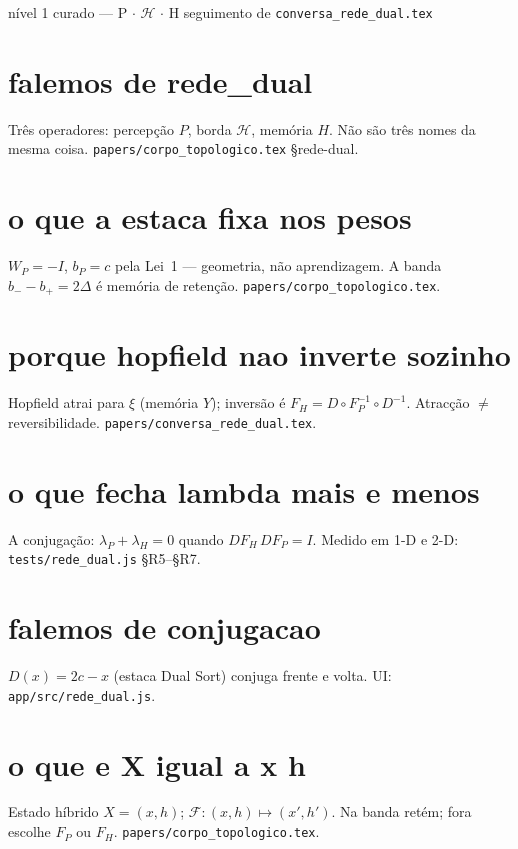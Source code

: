 \documentclass[11pt,a4paper]{article}
\newcommand{\code}[1]{\texttt{\small #1}}
\begin{document}
       {nível 1 curado --- P $\cdot$ $\mathcal{H}$ $\cdot$ H}
       {seguimento de \code{conversa\_rede\_dual.tex}}
\maketitle
\begin{abstract}
Follow-ups curtos sobre a rede neural dual.
Fonte: \code{papers/corpo\_topologico.tex} \S rede-dual;
medidor \code{tests/rede\_dual.js}.
\end{abstract}

\section{falemos de rede\_dual}
Três operadores: percepção $P$, borda $\mathcal{H}$, memória $H$.
Não são três nomes da mesma coisa.
\code{papers/corpo\_topologico.tex} \S rede-dual.

\section{o que a estaca fixa nos pesos}
$W_P=-I$, $b_P=c$ pela Lei~1 --- geometria, não aprendizagem.
A banda $b_{-}-b_{+}=2\Delta$ é memória de retenção.
\code{papers/corpo\_topologico.tex}.

\section{porque hopfield nao inverte sozinho}
Hopfield atrai para $\xi$ (memória $Y$); inversão é $F_H=D\circ F_P^{-1}\circ D^{-1}$.
Atracção $\neq$ reversibilidade.
\code{papers/conversa\_rede\_dual.tex}.

\section{o que fecha lambda mais e menos}
A conjugação: $\lambda_P+\lambda_H=0$ quando $DF_H\,DF_P=I$.
Medido em 1-D e 2-D: \code{tests/rede\_dual.js} §R5--§R7.

\section{falemos de conjugacao}
$D(x)=2c-x$ (estaca Dual Sort) conjuga frente e volta.
UI: \code{app/src/rede\_dual.js}.

\section{o que e X igual a x h}
Estado híbrido $X=(x,h)$; $\mathcal{F}\colon(x,h)\mapsto(x',h')$.
Na banda retém; fora escolhe $F_P$ ou $F_H$.
\code{papers/corpo\_topologico.tex}.
\end{document}
